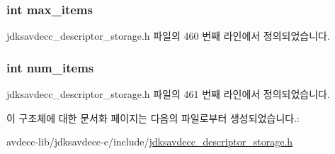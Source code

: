 \subsubsection[{\texorpdfstring{max\+\_\+items}{max_items}}]{\setlength{\rightskip}{0pt plus 5cm}int max\+\_\+items}\hypertarget{structjdksavdecc__descriptor__storage__symbols_a8cde3174940399d21be04f9df675cd2d}{}\label{structjdksavdecc__descriptor__storage__symbols_a8cde3174940399d21be04f9df675cd2d}


jdksavdecc\+\_\+descriptor\+\_\+storage.\+h 파일의 460 번째 라인에서 정의되었습니다.

\subsubsection[{\texorpdfstring{num\+\_\+items}{num_items}}]{\setlength{\rightskip}{0pt plus 5cm}int num\+\_\+items}\hypertarget{structjdksavdecc__descriptor__storage__symbols_af0bbed14cf6294c187499179ee38189d}{}\label{structjdksavdecc__descriptor__storage__symbols_af0bbed14cf6294c187499179ee38189d}


jdksavdecc\+\_\+descriptor\+\_\+storage.\+h 파일의 461 번째 라인에서 정의되었습니다.



이 구조체에 대한 문서화 페이지는 다음의 파일로부터 생성되었습니다.\+:\begin{DoxyCompactItemize}
\item 
avdecc-\/lib/jdksavdecc-\/c/include/\hyperlink{jdksavdecc__descriptor__storage_8h}{jdksavdecc\+\_\+descriptor\+\_\+storage.\+h}\end{DoxyCompactItemize}
